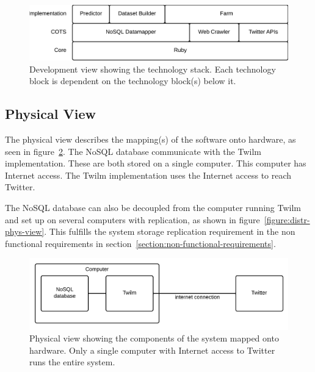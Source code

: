 \begin{figure}[H]
    \centerline{\includegraphics[width=4.5in]{image/architecture-development-view.png}}
    \caption[Development View]{Development view showing the technology stack. Each technology block is dependent on the technology block(s) below it.}
    \label{figure:development-view}
\end{figure}

\subsection{Physical View}
The physical view describes the mapping(s) of the software onto hardware, as seen in figure~\ref{figure:physical-view}. The NoSQL database communicate with the Twilm implementation. These are both stored on a single computer. This computer has Internet access. The Twilm implementation uses the Internet access to reach Twitter.

The NoSQL database can also be decoupled from the computer running Twilm and set up on several computers with replication, as shown in figure~\ref{figure:distr-phys-view}. This fulfills the system storage replication requirement in the non functional requirements in section~\ref{section:non-functional-requirements}.

\begin{figure}[H]
\centerline{\includegraphics[width=4.5in]{image/architecture-physical-view.png}}
\caption[Physical View]{Physical view showing the components of the system mapped onto hardware. Only a single computer with Internet access to Twitter runs the entire system.}
\label{figure:physical-view}
\end{figure}

